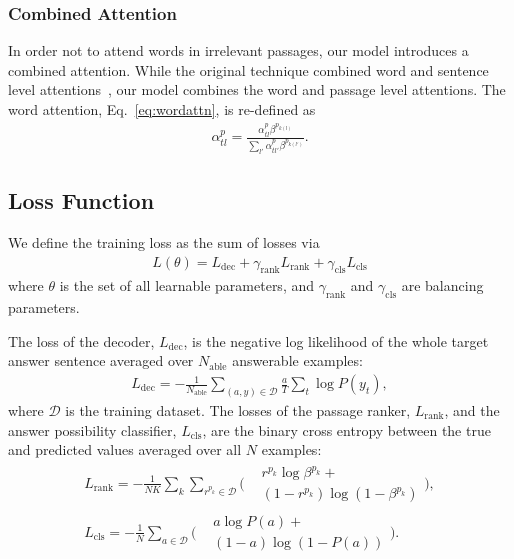 \documentclass[11pt,a4paper]{article}
\theoremstyle{mydef}
\theoremstyle{myprob}
\begin{document}
\subsubsection{Combined Attention}
\label{sec:combined}

In order not to attend words in irrelevant passages, our model introduces 
a combined attention. 
While the original technique combined 
word and sentence level attentions~\citep{HsuLLMTS18}, our model combines 
the word and passage level attentions. 
The word attention, Eq.~\ref{eq:wordattn}, is re-defined as
\begin{align}
\nonumber
\alpha^p_{tl} = \frac{\alpha^p_{tl} \beta^{p_{k(l)} }}{\sum_{l'} \alpha^p_{tl'} \beta^{p_{k(l')}}}.
\end{align}

\subsection{Loss Function}

We define the training loss as the sum of losses via 
\begin{align}
\nonumber
L(\theta) = L_\mathrm{dec} + \gamma_\mathrm{rank} L_\mathrm{rank} + \gamma_\mathrm{cls} L_\mathrm{cls}
\end{align}
where $\theta$ is the set of all learnable parameters, and $\gamma_\mathrm{rank}$ and $\gamma_\mathrm{cls}$ are balancing parameters.

The loss of the decoder, $L_\mathrm{dec}$, is the negative log likelihood of the whole target answer sentence averaged over $N_\mathrm{able}$ answerable examples:
\begin{align}
\nonumber
L_\mathrm{dec} = - \frac{1}{N_\mathrm{able}}\sum_{(a,y)\in \mathcal{D}} \frac{a}{T} \sum_t \log P(y_{t}),
\end{align}
where $\mathcal{D}$ is the training dataset.
The losses of the passage ranker, $L_\mathrm{rank}$, and
the answer possibility classifier, $L_\mathrm{cls}$, are 
the binary cross entropy between the true and predicted values averaged over all $N$ examples:
\begingroup\makeatletter\def\f@size{9.5}\check@mathfonts
\begin{gather}
\nonumber
L_\mathrm{rank} = -  \frac{1}{NK} \sum_k \sum_{r^{p_k}\in\mathcal{D}}  
\biggl(
\begin{split}
&r^{p_k} \log \beta^{p_k} +  \\
&(1-r^{p_k}) \log (1-\beta^{p_k}) 
\end{split}
\biggr),\\
\nonumber
L_\mathrm{cls} = - \frac{1}{N} \sum_{a \in \mathcal{D}} 
\biggl(
\begin{split}
&a \log P(a) + \\
&(1-a) \log (1-P(a)) 
\end{split}
\biggr).
\end{gather}
\endgroup
\end{document}
